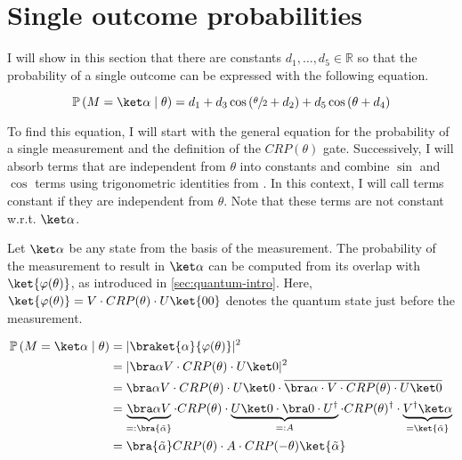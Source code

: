 \section{Single outcome probabilities}
\label{sec:single-outcome-probability}

I will show in this section that there are constants
$d_1, \dots, d_5 \in \mathbb R$ so that the probability of a single outcome can
be expressed with the following equation.

\begin{equation}
    \mathbb P\left(M = \ket \alpha \mid \theta\right)
        = d_1 + d_3 \cos\left(\sfrac\theta2 + d_2\right) + d_5 \cos\left(\theta + d_4\right)
\end{equation}

To find this equation, I will start with the general equation for the
probability of a single measurement and the definition of the $CRP(\theta)$
gate. 
Successively, I will absorb terms that are independent from $\theta$ into
constants and combine $\sin$ and $\cos$ terms using trigonometric identities
from \cite{bronstejn_taschenbuch_2016}.
In this context, I will call terms constant if they are independent from
$\theta$.
Note that these terms are not constant w.r.t. $\ket\alpha$.

Let $\ket\alpha$ be any state from the basis of the measurement.
The probability of the measurement to result in $\ket\alpha$ can be computed
from its overlap with $\ket{\varphi(\theta)}$, as introduced in
\autoref{sec:quantum-intro}.
Here, $\ket{\varphi(\theta)} = V \cdot CRP(\theta) \cdot U\ket{00}$ denotes the
quantum state just before the measurement.

\begin{equation}
    \label{eq:single-outcome-prob}
    \begin{split}
        \mathbb P\left(M = \ket\alpha \mid \theta\right)
            &= \lvert\braket{\alpha}{\varphi(\theta)}\rvert^2\\
            &= \lvert \bra\alpha V \cdot CRP(\theta) \cdot U \ket0 \rvert^2 \\
            &= \bra\alpha V \cdot CRP(\theta) \cdot U \ket0
                \cdot \overline{\bra\alpha \cdot V \cdot CRP(\theta) \cdot U \ket0} \\
            &= \underbrace{\bra\alpha V}_{=: \bra{\tilde\alpha}} \cdot CRP(\theta)
                \cdot \underbrace{U \ket0 \cdot \bra0 \cdot U^\dagger}_{=: A} \cdot CRP(\theta)^\dagger
                \cdot \underbrace{V^\dagger \ket\alpha}_{=\ket{\tilde\alpha}} \\
            &= \bra{\tilde\alpha} CRP(\theta) \cdot A \cdot CRP(-\theta) \ket{\tilde\alpha}
    \end{split}
\end{equation}

